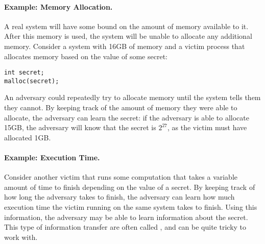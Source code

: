 \paragraph{Example: Memory Allocation.} A real system will have some bound on the amount of memory available to it. After this memory is used, the system will be unable to allocate any additional memory. Consider a system with 16GB of memory and a victim process that allocates memory based on the value of some secret:

\begin{lstlisting}
int secret;
malloc(secret);
\end{lstlisting}

An adversary could repeatedly try to allocate memory until the system tells them they cannot. By keeping track of the amount of memory they were able to allocate, the adversary can learn the secret: if the adversary is able to allocate 15GB, the adversary will know that the secret is $2^{27}$, as the victim must have allocated 1GB.

\paragraph{Example: Execution Time.} Consider another victim that runs some computation that takes a variable amount of time to finish depending on the value of a secret. By keeping track of how long the adversary takes to finish, the adversary can learn how much execution time the victim running on the same system takes to finish. Using this information, the adversary may be able to learn information about the secret. This type of information transfer are often called , and can be quite tricky to work with.

\medskip

